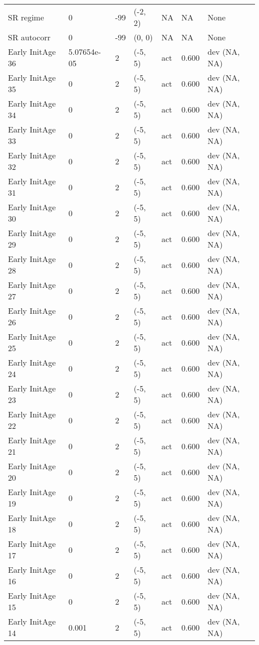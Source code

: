 \documentclass[11pt,
  english,
  letterpaper,
]{article}
\begin{document}
\begin{landscape}
\begin{longtable}[t]{>{\raggedright\arraybackslash}p{7.5cm}lllll>{\raggedright\arraybackslash}p{3.5cm}}
SR regime & 0 & -99 & (-2, 2) & NA & NA & None\\
SR autocorr & 0 & -99 & (0, 0) & NA & NA & None\\
Early InitAge 36 & 5.07654e-05 & 2 & (-5, 5) & act & 0.600 & dev (NA, NA)\\
Early InitAge 35 & 0 & 2 & (-5, 5) & act & 0.600 & dev (NA, NA)\\
Early InitAge 34 & 0 & 2 & (-5, 5) & act & 0.600 & dev (NA, NA)\\
Early InitAge 33 & 0 & 2 & (-5, 5) & act & 0.600 & dev (NA, NA)\\
Early InitAge 32 & 0 & 2 & (-5, 5) & act & 0.600 & dev (NA, NA)\\
Early InitAge 31 & 0 & 2 & (-5, 5) & act & 0.600 & dev (NA, NA)\\
Early InitAge 30 & 0 & 2 & (-5, 5) & act & 0.600 & dev (NA, NA)\\
Early InitAge 29 & 0 & 2 & (-5, 5) & act & 0.600 & dev (NA, NA)\\
Early InitAge 28 & 0 & 2 & (-5, 5) & act & 0.600 & dev (NA, NA)\\
Early InitAge 27 & 0 & 2 & (-5, 5) & act & 0.600 & dev (NA, NA)\\
Early InitAge 26 & 0 & 2 & (-5, 5) & act & 0.600 & dev (NA, NA)\\
Early InitAge 25 & 0 & 2 & (-5, 5) & act & 0.600 & dev (NA, NA)\\
Early InitAge 24 & 0 & 2 & (-5, 5) & act & 0.600 & dev (NA, NA)\\
Early InitAge 23 & 0 & 2 & (-5, 5) & act & 0.600 & dev (NA, NA)\\
Early InitAge 22 & 0 & 2 & (-5, 5) & act & 0.600 & dev (NA, NA)\\
Early InitAge 21 & 0 & 2 & (-5, 5) & act & 0.600 & dev (NA, NA)\\
Early InitAge 20 & 0 & 2 & (-5, 5) & act & 0.600 & dev (NA, NA)\\
Early InitAge 19 & 0 & 2 & (-5, 5) & act & 0.600 & dev (NA, NA)\\
Early InitAge 18 & 0 & 2 & (-5, 5) & act & 0.600 & dev (NA, NA)\\
Early InitAge 17 & 0 & 2 & (-5, 5) & act & 0.600 & dev (NA, NA)\\
Early InitAge 16 & 0 & 2 & (-5, 5) & act & 0.600 & dev (NA, NA)\\
Early InitAge 15 & 0 & 2 & (-5, 5) & act & 0.600 & dev (NA, NA)\\
Early InitAge 14 & 0.001 & 2 & (-5, 5) & act & 0.600 & dev (NA, NA)\\

\end{longtable}
\end{landscape}
\end{document}
